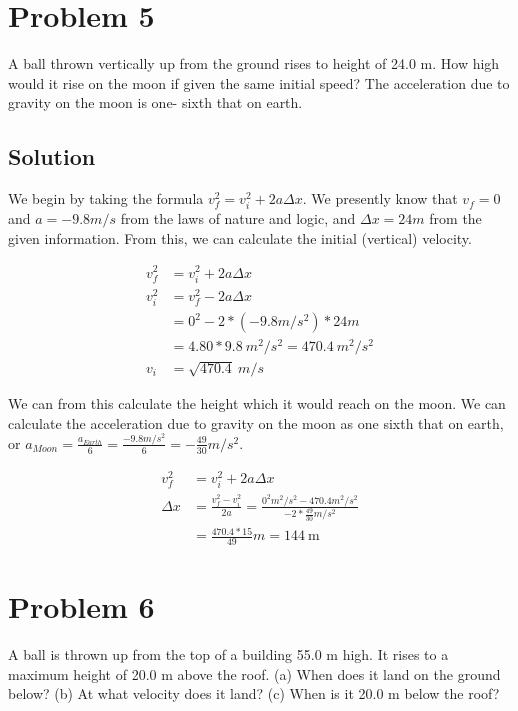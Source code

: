 \documentclass[12pt]{article}
\begin{document}
\pagebreak

\section*{Problem 5}

A ball thrown vertically up from the ground rises to height of 24.0 m. How high would it rise
on the moon if given the same initial speed? The acceleration due to gravity on the moon is one-
sixth that on earth.

\subsection*{Solution}
We begin by taking the formula $v_f^2 = v_i^2 + 2a\Delta x$. We presently know that $v_f=0$ and $a=-9.8\unit{m/s}$ from the laws of nature and logic, and $\Delta x=24\unit{m}$ from the given information. From this, we can calculate the initial (vertical) velocity.

\begin{align*}
    v_f^2 &= v_i^2 + 2a\Delta x\\
    v_i^2 &= v_f^2 - 2a\Delta x\\
        &= 0^2 - 2*(-9.8\unit{m/s^2})*24\unit{m}\\
        &= 4.80 * 9.8\ \unit{m^2/s^2} = 470.4\ \unit{m^2/s^2}\\
    v_i &= \sqrt{470.4}\ \unit{m/s}
\end{align*}

We can from this calculate the height which it would reach on the moon. We can calculate the acceleration due to gravity on the moon as one sixth that on earth, or $a_{Moon} = \frac{a_{Earth}}{6} = \frac{-9.8 \unit{m/s^2}}{6} = -\frac{49}{30}\unit{m/s^2}$.

\begin{align*}
    v_f^2 &= v_i^2 + 2a\Delta x\\
    \Delta x &= \frac{v_f^2 - v_i^2}{2a} = \frac{0^2 \unit{m^2/s^2} - 470.4 \unit{m^2/s^2}}{-2*\frac{49}{30}\unit{m/s^2}}\\
            &= \frac{470.4 * 15}{49} \unit{m}= \boxed{144\ \unit{\meter}}
\end{align*}

\pagebreak
\section*{Problem 6}

A ball is thrown up from the top of a building 55.0 m high. It rises to a maximum height
of 20.0 m above the roof. (a) When does it land on the ground below? (b) At what velocity
does it land? (c) When is it 20.0 m below the roof?
\end{document}
